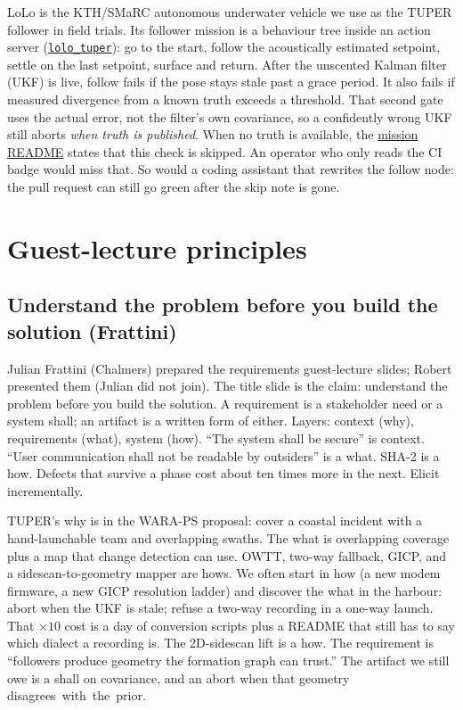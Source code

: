 \documentclass[11pt,a4paper,twocolumn]{amsart}
\begin{document}
LoLo is the KTH/SMaRC autonomous underwater vehicle we use as the TUPER follower in field trials. Its follower mission is a behaviour tree inside an action server (\href{https://github.com/smarc-project/smarc2/tree/humble/behaviours/lolo/lolo_tuper}{\texttt{lolo\_tuper}}): go to the start, follow the acoustically estimated setpoint, settle on the last setpoint, surface and return. After the unscented Kalman filter (UKF) is live, follow fails if the pose stays stale past a grace period. It also fails if measured divergence from a known truth exceeds a threshold. That second gate uses the actual error, not the filter's own covariance, so a confidently wrong UKF still aborts \emph{when truth is published}. When no truth is available, the \href{https://github.com/smarc-project/smarc2/blob/humble/behaviours/lolo/lolo_tuper/README.md}{mission README} states that this check is skipped. An operator who only reads the CI badge would miss that. So would a coding assistant that rewrites the follow node: the pull request can still go green after the skip note is gone.

\section{Guest-lecture principles}
\label{sec:guest}

\subsection{Understand the problem before you build the solution (Frattini)}
\label{sec:frattini}

Julian Frattini (Chalmers) prepared the requirements guest-lecture slides; Robert presented them (Julian did not join). The title slide is the claim: understand the problem before you build the solution. A requirement is a stakeholder need or a system shall; an artifact is a written form of either. Layers: context (why), requirements (what), system (how). ``The system shall be secure'' is context. ``User communication shall not be readable by outsiders'' is a what. SHA-2 is a how. Defects that survive a phase cost about ten times more in the next. Elicit incrementally.

TUPER's why is in the WARA-PS proposal: cover a coastal incident with a hand-launchable team and overlapping swaths. The what is overlapping coverage plus a map that change detection can use. OWTT, two-way fallback, GICP, and a sidescan-to-geometry mapper are hows. We often start in how (a new modem firmware, a new GICP resolution ladder) and discover the what in the harbour: abort when the UKF is stale; refuse a two-way recording in a one-way launch. That $\times 10$ cost is a day of conversion scripts plus a README that still has to say which dialect a recording is. The 2D-sidescan lift is a how. The requirement is ``followers produce geometry the formation graph can trust.'' The artifact we still owe is a shall on covariance, and an abort when that geometry \mbox{disagrees with the prior.}
\end{document}
